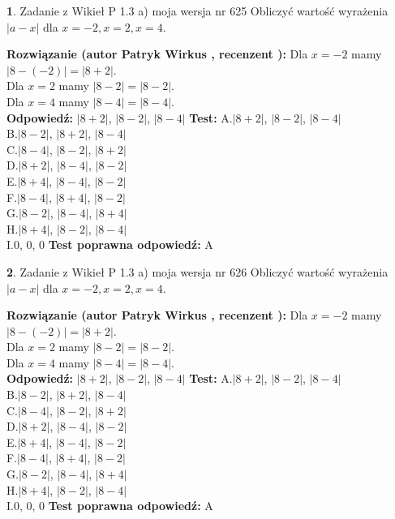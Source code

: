 \documentclass[12pt, a4paper]{article}
\theoremstyle{definition} %
\newtheorem{zad}{}
\newcommand{\zadStart}[1]{\begin{zad}#1\newline}
\newcommand{\zadStop}{\end{zad}}
\newcommand{\rozwStart}[2]{\noindent \textbf{Rozwiązanie (autor #1 , recenzent #2): }\newline}
\newcommand{\rozwStop}{\newline}
\newcommand{\odpStart}{\noindent \textbf{Odpowiedź:}\newline}
\newcommand{\odpStop}{\newline}
\newcommand{\testStart}{\noindent \textbf{Test:}\newline}
\newcommand{\testStop}{\newline}
\newcommand{\kluczStart}{\noindent \textbf{Test poprawna odpowiedź:}\newline}
\newcommand{\kluczStop}{\newline}
\begin{document}
\zadStart{Zadanie z Wikieł P 1.3 a) moja wersja nr 625}
Obliczyć wartość wyrażenia $|a - x|$ dla $x=-2,x=2,x=4$.
\zadStop
\rozwStart{Patryk Wirkus}{}
Dla $x = -2$ mamy $|8 - (-2)| = |8 + 2|$.\\
Dla $x = 2$ mamy $|8 - 2| = |8 - 2|$.\\
Dla $x = 4$ mamy $|8 - 4| = |8 - 4|$.\\
\rozwStop
\odpStart
$|8 + 2|$, $|8 - 2|$, $|8 - 4|$
\odpStop
\testStart
A.$|8 + 2|$, $|8 - 2|$, $|8 - 4|$\\
B.$|8 - 2|$, $|8 + 2|$, $|8 - 4|$\\
C.$|8 - 4|$, $|8 - 2|$, $|8 + 2|$\\
D.$|8 + 2|$, $|8 - 4|$, $|8 - 2|$\\
E.$|8 + 4|$, $|8 - 4|$, $|8 - 2|$\\
F.$|8 - 4|$, $|8 + 4|$, $|8 - 2|$\\
G.$|8 - 2|$, $|8 - 4|$, $|8 + 4|$\\
H.$|8 + 4|$, $|8 - 2|$, $|8 - 4|$\\
I.$0$, $0$, $0$
\testStop
\kluczStart
A
\kluczStop



\zadStart{Zadanie z Wikieł P 1.3 a) moja wersja nr 626}
Obliczyć wartość wyrażenia $|a - x|$ dla $x=-2,x=2,x=4$.
\zadStop
\rozwStart{Patryk Wirkus}{}
Dla $x = -2$ mamy $|8 - (-2)| = |8 + 2|$.\\
Dla $x = 2$ mamy $|8 - 2| = |8 - 2|$.\\
Dla $x = 4$ mamy $|8 - 4| = |8 - 4|$.\\
\rozwStop
\odpStart
$|8 + 2|$, $|8 - 2|$, $|8 - 4|$
\odpStop
\testStart
A.$|8 + 2|$, $|8 - 2|$, $|8 - 4|$\\
B.$|8 - 2|$, $|8 + 2|$, $|8 - 4|$\\
C.$|8 - 4|$, $|8 - 2|$, $|8 + 2|$\\
D.$|8 + 2|$, $|8 - 4|$, $|8 - 2|$\\
E.$|8 + 4|$, $|8 - 4|$, $|8 - 2|$\\
F.$|8 - 4|$, $|8 + 4|$, $|8 - 2|$\\
G.$|8 - 2|$, $|8 - 4|$, $|8 + 4|$\\
H.$|8 + 4|$, $|8 - 2|$, $|8 - 4|$\\
I.$0$, $0$, $0$
\testStop
\kluczStart
A
\kluczStop
\end{document}

